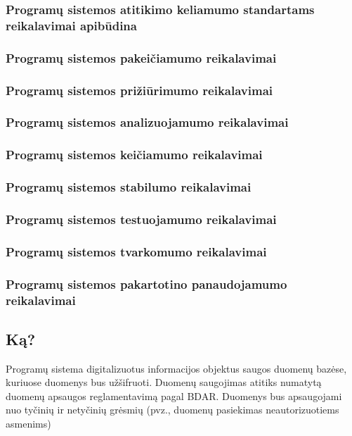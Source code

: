 \documentclass{VUMIFPSkursinis}
\begin{document}
	\subsubsection{Programų sistemos atitikimo keliamumo standartams reikalavimai apibūdina}
	\subsubsection{Programų sistemos pakeičiamumo reikalavimai}
	\subsubsection{Programų sistemos prižiūrimumo reikalavimai}
	\subsubsection{Programų sistemos analizuojamumo reikalavimai}
	\subsubsection{Programų sistemos keičiamumo reikalavimai}
	\subsubsection{Programų sistemos stabilumo reikalavimai}
	\subsubsection{Programų sistemos testuojamumo reikalavimai}
	\subsubsection{Programų sistemos tvarkomumo reikalavimai}
	\subsubsection{Programų sistemos pakartotino panaudojamumo reikalavimai}

\subsection{Ką?}\label{sec:PSReqWhat}
Programų sistema digitalizuotus informacijos objektus saugos duomenų bazėse, kuriuose duomenys bus užšifruoti. Duomenų saugojimas atitiks numatytą duomenų apsaugos reglamentavimą pagal BDAR. Duomenys bus apsaugojami nuo tyčinių ir netyčinių grėsmių (pvz., duomenų pasiekimas neautorizuotiems asmenims)
\end{document}
